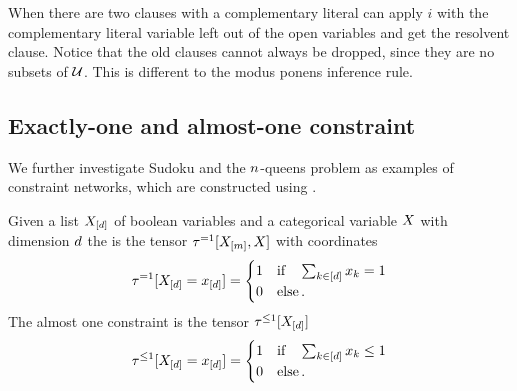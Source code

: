 \begin{example}[Resolution]
    When there are two clauses with a complementary literal can apply $i$ with the complementary literal variable left out of the open variables and get the resolvent clause.
    Notice that the old clauses cannot always be dropped, since they are no subsets of $\mathcal{U}$.
    This is different to the modus ponens inference rule.
\end{example}

\subsection{Exactly-one and almost-one constraint}


We further investigate Sudoku and the $n$-queens problem as examples of constraint networks, which are constructed using \eoconword.



\begin{definition}\label{def:exactlyAlmostOneConstraint}
    Given a list $X_{[d]}$ of boolean variables and a categorical variable $X$ with dimension $d$ the \eoconword is the tensor $\tau^{=1}[X_{[m]},X]$ with coordinates
    \begin{align*}
        \tau^{=1}[X_{[d]}=x_{[d]}]
        = \begin{cases}
              1 & \text{if}\quad \sum_{k\in[d]} x_{k} = 1 \\
              0 & \text{else} \, .
        \end{cases}
    \end{align*}
    The almost one constraint is the tensor $\tau^{\leq 1}[X_{[d]}]$
    \begin{align*}
        \tau^{\leq 1}[X_{[d]}=x_{[d]}]
        = \begin{cases}
              1 & \text{if}\quad \sum_{k\in[d]} x_{k} \leq 1 \\
              0 & \text{else} \, .
        \end{cases}
    \end{align*}
\end{definition}


